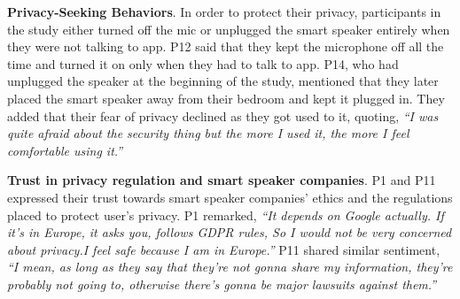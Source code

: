     
    \textbf{ Privacy-Seeking Behaviors}.
    In order to protect their privacy, participants in the study either turned off the mic or unplugged the smart speaker entirely when they were not talking to \acl{app}. 
    P12 said that they kept the microphone off all the time and turned it on only when they had to talk to \acl{app}. 
    P14, who had unplugged the speaker at the beginning of the study, mentioned that they later placed the smart speaker away from their bedroom and kept it plugged in. They added that their fear of privacy declined as they got used to it, quoting,  
    	    \textit{
        	``I was quite afraid about the security thing but the more I used it, the more I feel comfortable using it.''
            }

    \textbf{Trust in privacy regulation and smart speaker companies}.
        P1 and P11 expressed their trust towards smart speaker companies' ethics and the regulations placed to protect user's privacy.
        P1 remarked,    
            \textit{``It depends on Google actually. If it’s in Europe, it asks you, follows \ac{GDPR} rules, So I would not be very concerned about privacy.I feel safe because I am in Europe.''}
        P11 shared similar sentiment,
        \textit{``I mean, as long as they say that they're not gonna share my information, they're probably not going to, otherwise there's gonna be major lawsuits against them.'' }
        
